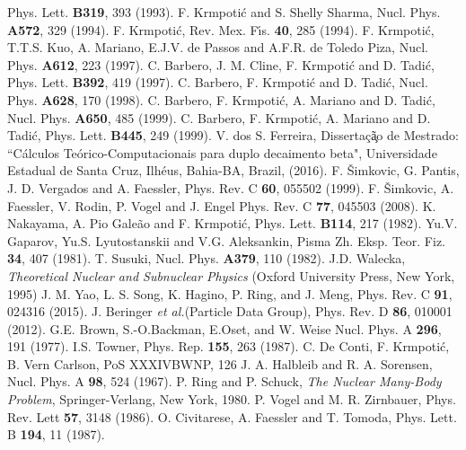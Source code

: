 \documentclass[nofootinbib,twocolumn,eqsecnum,floats,aps]{revtex4}
\def\etal {{\it et al.}}
\begin{document}
{\begin{thebibliography}{99}
Phys. Lett. {\bf B319}, 393 (1993).
 F. Krmpoti\'{c} and S. Shelly Sharma,
Nucl. Phys. {\bf A572}, 329 (1994).
 F. Krmpoti\'c,
Rev. Mex. F\'{\i}s. {\bf 40}, 285 (1994).
 F. Krmpoti\'c, T.T.S. Kuo, A. Mariano, E.J.V. de Passos
and A.F.R. de Toledo Piza,
Nucl. Phys. {\bf A612}, 223 (1997).
 C. Barbero, J. M. Cline, F. Krmpoti\'c and D. Tadi\'c,
Phys. Lett. {\bf B392}, 419 (1997).
 C. Barbero, F. Krmpoti\'c and D. Tadi\'c,
Nucl. Phys. {\bf A628}, 170 (1998).
 C. Barbero, F. Krmpoti\'c, A. Mariano and D. Tadi\'c,
Nucl. Phys. {\bf A650}, 485 (1999).
 C. Barbero, F. Krmpoti\'c, A. Mariano and D. Tadi\'c,
Phys.  Lett. {\bf B445}, 249 (1999).
 V. dos S. Ferreira, Disserta\c{c}\~{a}̧o
de Mestrado: ``C\'alculos Te\'orico-Computacionais para duplo decaimento beta",
Universidade Estadual de Santa Cruz, Ilh\'eus, Bahia-BA, Brazil, (2016).
 F. \v Simkovic, G. Pantis, J. D. Vergados and A. Faessler,
Phys.  Rev. C {\bf 60}, 055502 (1999).
 F. \v Simkovic,   A. Faessler, V. Rodin,  P. Vogel and J. Engel
Phys. Rev. C {\bf 77}, 045503 (2008).
  K. Nakayama, A. Pio Gale\~{a}o  and  F. Krmpoti\'{c},
Phys. Lett. {\bf B114}, 217 (1982).
 Yu.V. Gaparov, Yu.S. Lyutostanskii and V.G. Aleksankin,
Pisma Zh. Eksp. Teor. Fiz. {\bf 34}, 407 (1981).
 T. Susuki, Nucl. Phys. {\bf A379}, 110 (1982).
  J.D. Walecka, {\it Theoretical Nuclear and Subnuclear Physics}
(Oxford University Press, New York, 1995)
 J. M. Yao, L. S. Song, K. Hagino, P. Ring, and J. Meng,
Phys. Rev. C {\bf 91},  024316 (2015).
 J. Beringer \etal (Particle Data Group),
Phys. Rev. D {\bf 86}, 010001 (2012).
 G.E. Brown,  S.-O.Backman, E.Oset, and W. Weise
 Nucl. Phys. A  {\bf 296}, 191 (1977).
 I.S. Towner, Phys. Rep.  {\bf155}, 263 (1987).
 C. De Conti, F. Krmpoti\'c, B. Vern Carlson,
PoS XXXIVBWNP, 126
 J. A. Halbleib and R. A. Sorensen,
Nucl. Phys. A \textbf{98}, 524 (1967).
 P. Ring and P. Schuck,
{\it The Nuclear Many-Body Problem}, Springer-Verlang, New York, 1980.
 P. Vogel and M. R. Zirnbauer,
Phys. Rev. Lett \textbf{57}, 3148 (1986).
 O. Civitarese, A. Faessler and T. Tomoda,
Phys. Lett. B \textbf{194}, 11 (1987).

\end{thebibliography}}
\end{document}
